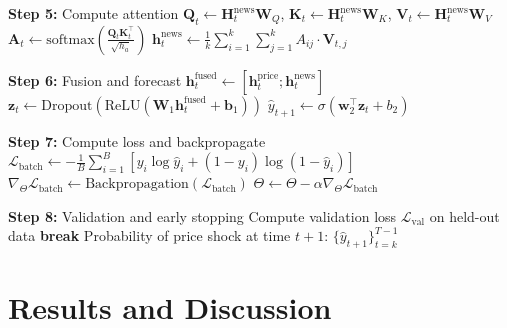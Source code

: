 \documentclass[12pt]{elsarticle}
\begin{document}
\begin{algorithm}[H]
{\begin{minipage}{\textwidth}
\begin{algorithmic}
            \STATE \textbf{Step 5:} Compute attention
            \STATE $\mathbf{Q}_t \leftarrow \mathbf{H}^{\text{news}}_t \mathbf{W}_Q$, $\mathbf{K}_t \leftarrow \mathbf{H}^{\text{news}}_t \mathbf{W}_K$, $\mathbf{V}_t \leftarrow \mathbf{H}^{\text{news}}_t \mathbf{W}_V$
            \STATE $\mathbf{A}_t \leftarrow \text{softmax}\left(\frac{\mathbf{Q}_t \mathbf{K}_t^\top}{\sqrt{h_a}}\right)$ 
            \STATE $\mathbf{h}^{\text{news}}_t \leftarrow \frac{1}{k} \sum_{i=1}^{k} \sum_{j=1}^{k} A_{ij} \cdot \mathbf{V}_{t,j}$ 
            
            \STATE \textbf{Step 6:} Fusion and forecast
            \STATE $\mathbf{h}^{\text{fused}}_t \leftarrow [\mathbf{h}^{\text{price}}_t; \mathbf{h}^{\text{news}}_t]$ 
            \STATE $\mathbf{z}_t \leftarrow \text{Dropout}(\text{ReLU}(\mathbf{W}_1 \mathbf{h}^{\text{fused}}_t + \mathbf{b}_1))$
            \STATE $\hat{y}_{t+1} \leftarrow \sigma(\mathbf{w}_2^\top \mathbf{z}_t + b_2)$ 
        \ENDFOR
        
        \STATE \textbf{Step 7:} Compute loss and backpropagate
        \STATE $\mathcal{L}_{\text{batch}} \leftarrow -\frac{1}{B} \sum_{i=1}^{B} [y_i \log \hat{y}_i + (1-y_i) \log(1-\hat{y}_i)]$
        \STATE $\nabla_\Theta \mathcal{L}_{\text{batch}} \leftarrow \text{Backpropagation}(\mathcal{L}_{\text{batch}})$
        \STATE $\Theta \leftarrow \Theta - \alpha \nabla_\Theta \mathcal{L}_{\text{batch}}$ 
    \ENDFOR
    
    \STATE \textbf{Step 8:} Validation and early stopping
    \STATE Compute validation loss $\mathcal{L}_{\text{val}}$ on held-out data
        \STATE \textbf{break} 
    \ENDIF
\ENDFOR
\RETURN Probability of price shock at time $t+1$: $\{\hat{y}_{t+1}\}_{t=k}^{T-1}$
\end{algorithmic}
\end{minipage}
}
\end{algorithm}
\vspace{-1em}




\section{Results and Discussion}
\label{sec:results}
\end{document}
